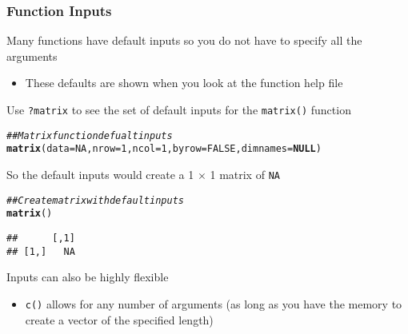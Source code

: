 \documentclass{beamer}\usepackage[]{graphicx}\usepackage[]{color}
\makeatletter
\newcommand{\hlnum}[1]{\textcolor[rgb]{0.686,0.059,0.569}{#1}}%
\newcommand{\hlcom}[1]{\textcolor[rgb]{0.678,0.584,0.686}{\textit{#1}}}%
\newcommand{\hlstd}[1]{\textcolor[rgb]{0.345,0.345,0.345}{#1}}%
\newcommand{\hlkwa}[1]{\textcolor[rgb]{0.161,0.373,0.58}{\textbf{#1}}}%
\newcommand{\hlkwc}[1]{\textcolor[rgb]{0.333,0.667,0.333}{#1}}%
\newcommand{\hlkwd}[1]{\textcolor[rgb]{0.737,0.353,0.396}{\textbf{#1}}}%
\newenvironment{kframe}{%
 \def\at@end@of@kframe{}%
 \ifinner\ifhmode%
  \def\at@end@of@kframe{\end{minipage}}%
  \begin{minipage}{\columnwidth}%
 \fi\fi%
 \def\FrameCommand##1{\hskip\@totalleftmargin \hskip-\fboxsep
 \colorbox{shadecolor}{##1}\hskip-\fboxsep
     \hskip-\linewidth \hskip-\@totalleftmargin \hskip\columnwidth}%
 \MakeFramed {\advance\hsize-\width
   \@totalleftmargin\z@ \linewidth\hsize
   \@setminipage}}%
 {\par\unskip\endMakeFramed%
 \at@end@of@kframe}
\newenvironment{knitrout}{}{} %
\makeatother
\begin{document}
\begin{frame}[fragile]\frametitle{Function Inputs}
    Many functions have default inputs so you do not have to specify all the arguments
    \begin{itemize}
        \item These defaults are shown when you look at the function help file
    \end{itemize}
    \vspace{2ex}
    Use \texttt{?matrix} to see the set of default inputs for the \texttt{matrix()} function
\begin{knitrout}\footnotesize
{}\color{fgcolor}\begin{kframe}
\begin{alltt}
\hlcom{## Matrix function defualt inputs}
\hlkwd{matrix}\hlstd{(}\hlkwc{data} \hlstd{=} \hlnum{NA}\hlstd{,} \hlkwc{nrow} \hlstd{=} \hlnum{1}\hlstd{,} \hlkwc{ncol} \hlstd{=} \hlnum{1}\hlstd{,} \hlkwc{byrow} \hlstd{=} \hlnum{FALSE}\hlstd{,} \hlkwc{dimnames} \hlstd{=} \hlkwa{NULL}\hlstd{)}
\end{alltt}
\end{kframe}
\end{knitrout}
    \vspace{2ex}
    So the default inputs would create a 1 $\times$ 1 matrix of \texttt{NA}
\begin{knitrout}\footnotesize
{}\color{fgcolor}\begin{kframe}
\begin{alltt}
\hlcom{## Create matrix with default inputs}
\hlkwd{matrix}\hlstd{()}
\end{alltt}
\begin{verbatim}
##      [,1]
## [1,]   NA
\end{verbatim}
\end{kframe}
\end{knitrout}
    \vspace{2ex}
    Inputs can also be highly flexible
    \begin{itemize}
        \item \texttt{c()} allows for any number of arguments (as long as you have the memory to create a vector of the specified length)
    \end{itemize}
\end{frame}
\end{document}
